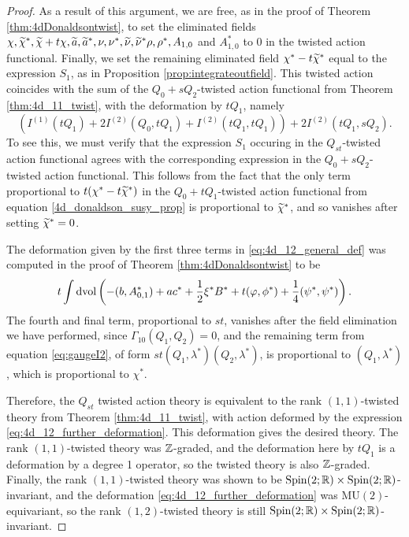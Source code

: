 \documentclass[10pt, oneside]{article}
\newcommand{\MU}{\mathrm{MU}}
\begin{document}
\begin{proof}
As a result of this argument, we are free, as in the proof of Theorem \ref{thm:4dDonaldsontwist}, to set the eliminated fields $\chi, \widetilde{\chi}^*, \widetilde{\chi} + t\chi, \widetilde{a}, \widetilde{a}^*, \nu, \nu^*, \widetilde{\nu}, \widetilde{\nu}^* \rho, \rho^*, A_{1,0}$ and $A_{1,0}^*$ to 0 in the twisted action functional.  Finally, we set the remaining eliminated field $\chi^*-t\widetilde{\chi}^*$ equal to the expression $S_1$, as in Proposition \ref{prop:integrateoutfield}.  This twisted action coincides with the sum of the $Q_0 + sQ_2$-twisted action functional from Theorem \ref{thm:4d_11_twist}, with the deformation by $tQ_1$, namely
\begin{equation}
\label{eq:4d_12_general_def}
\left(I^{(1)}(tQ_1) + 2 I^{(2)}(Q_0, tQ_1) + I^{(2)}(tQ_1, tQ_1)\right) + 2I^{(2)}(tQ_1, sQ_2).
\end{equation}
To see this, we must verify that the expression $S_1$ occuring in the $Q_{st}$-twisted action functional agrees with the corresponding expression in the $Q_0 + sQ_2$-twisted action functional.  This follows from the fact that the only term proportional to $t(\chi^*-t\widetilde{\chi}^*)$ in the $Q_0 + tQ_1$-twisted action functional from equation \ref{4d_donaldson_susy_prop} is proportional to $\widetilde{\chi}^*$, and so vanishes after setting $\widetilde{\chi}^* = 0$.

The deformation given by the first three terms in \ref{eq:4d_12_general_def} was computed in the proof of Theorem \ref{thm:4dDonaldsontwist} to be
\begin{equation}
\label{eq:4d_12_further_deformation}
t \int\operatorname{dvol}\left(-(b, A_{0, 1}^*) + a c^* + \frac{1}{2} \xi^* B^* + t (\varphi, \phi^*) + \frac 14 (\psi^*, \psi^*) \right).
\end{equation}
The fourth and final term, proportional to $st$, vanishes after the field elimination we have performed, since $\Gamma_{10}(Q_1,Q_2) = 0$, and the remaining term from equation \ref{eq:gaugeI2}, of form $st(Q_1,\lambda^*)(Q_2,\lambda^*)$, is proportional to $(Q_1,\lambda^*)$, which is proportional to $\chi^*$.

Therefore, the $Q_{st}$ twisted action theory is equivalent to the rank $(1,1)$-twisted theory from Theorem \ref{thm:4d_11_twist}, with action deformed by the expression \ref{eq:4d_12_further_deformation}.  This deformation gives the desired theory.  The rank $(1,1)$-twisted theory was $\mathbb Z$-graded, and the deformation here by $tQ_1$ is a deformation by a degree 1 operator, so the twisted theory is also $\mathbb Z$-graded.  Finally, the rank $(1,1)$-twisted theory was shown to be $\mathrm{Spin}(2;\mathbb R) \times \mathrm{Spin}(2;\mathbb R)$-invariant, and the deformation \ref{eq:4d_12_further_deformation} was $\MU(2)$-equivariant, so the rank $(1,2)$-twisted theory is still $\mathrm{Spin}(2;\mathbb R) \times \mathrm{Spin}(2;\mathbb R)$-invariant.

\end{proof}
\end{document}
